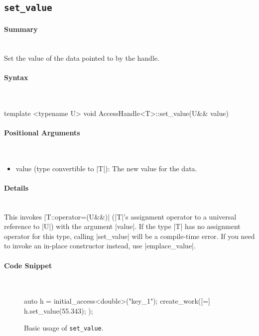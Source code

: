 \subsection{\texttt{set\_value}}

\paragraph{Summary} \mbox{}\\
Set the value of the data pointed to by the handle.

\paragraph{Syntax} \mbox{}\\
\begin{CppCode}
template <typename U>
void AccessHandle<T>::set_value(U&& value)
\end{CppCode}

\paragraph{Positional Arguments}\mbox{}\\
\begin{itemize}
  \item value (type convertible to |T|): The new value for the data.
\end{itemize}

\paragraph{Details}\mbox{}\\
This invokes |T::operator=(U&&)| (|T|'s assignment operator to
a universal reference to |U|) with the argument |value|.  If the type |T| has no
assignment operator for this type, calling |set_value| will be a compile-time
error.  If you need to invoke an in-place constructor instead, use |emplace_value|.

\paragraph{Code Snippet}\mbox{}\\
\begin{figure}[!h]
\begin{CppCodeNumb}
auto h = initial_access<double>("key_1");
create_work([=]{
  h.set_value(55.343);
});
\end{CppCodeNumb}
\label{fig:fe_api_set_value}
\caption{Basic usage of \lstinline|set_value|.}
\end{figure}

